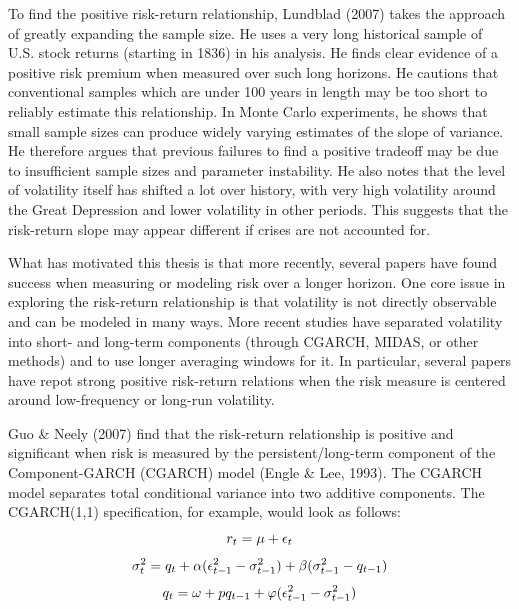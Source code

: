 \documentclass[12pt]{article}
\begin{document}
To find the positive risk-return relationship, Lundblad (2007) takes the approach of greatly expanding the sample size. He uses a very long historical sample of U.S. stock returns (starting in 1836) in his analysis. He finds clear evidence of a positive risk premium when measured over such long horizons. He cautions that conventional samples which are under 100 years in length may be too short to reliably estimate this relationship. In Monte Carlo experiments, he shows that small sample sizes can produce widely varying estimates of the slope of variance. He therefore argues that previous failures to find a positive tradeoff may be due to insufficient sample sizes and parameter instability. He also notes that the level of volatility itself has shifted a lot over history, with very high volatility around the Great Depression and lower volatility in other periods. This suggests that the risk-return slope may appear different if crises are not accounted for.\par
What has motivated this thesis is that more recently, several papers have found success when measuring or modeling risk over a longer horizon. One core issue in exploring the risk-return relationship is that volatility is not directly observable and can be modeled in many ways. More recent studies have separated volatility into short- and long-term components (through CGARCH, MIDAS, or other methods) and to use longer averaging windows for it. In particular, several papers have repot strong positive risk-return relations when the risk measure is centered around low-frequency or long-run volatility.\par
Guo \& Neely (2007) find that the risk-return relationship is positive and significant when risk is measured by the persistent/long-term component of the Component-GARCH (CGARCH) model (Engle \& Lee, 1993). The CGARCH model separates total conditional variance into two additive components. The CGARCH(1,1) specification, for example, would look as follows:
\begin{equation}
\nonumber
r_t=\mu+\epsilon_t\\
\end{equation}
\begin{equation}
\nonumber
\sigma_t^2=q_t+\alpha(\epsilon_{t-1}^2-\sigma_{t-1}^2)+\beta(\sigma_{t-1}^2-q_{t-1})\\
\end{equation}
\begin{equation}
\nonumber
q_t=\omega+pq_{t-1}+\varphi(\epsilon_{t-1}^2-\sigma_{t-1}^2)\\
\end{equation}
\end{document}
